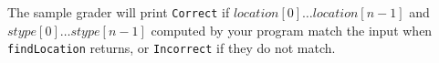 The sample grader will print \texttt{Correct} if $location[0] \ldots location[n - 1]$ and $stype[0] \ldots stype[n - 1]$ computed by your program match the input when \texttt{findLocation} returns, or \texttt{Incorrect} if they do not match.
